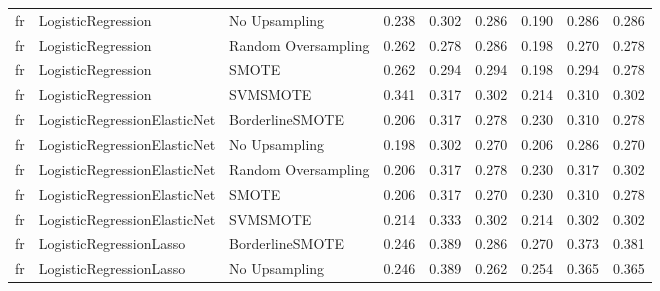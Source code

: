 \begin{tabular}{lllllllll}
      fr &              LogisticRegression &                 No Upsampling & 0.238 &                     0.302 &                 0.286 &                  0.190 &                                   0.286 &     0.286 \\
      fr &              LogisticRegression &           Random Oversampling & 0.262 &                     0.278 &                 0.286 &                  0.198 &                                   0.270 &     0.278 \\
      fr &              LogisticRegression &                         SMOTE & 0.262 &                     0.294 &                 0.294 &                  0.198 &                                   0.294 &     0.278 \\
      fr &              LogisticRegression &                      SVMSMOTE & 0.341 &                     0.317 &                 0.302 &                  0.214 &                                   0.310 &     0.302 \\
      fr &    LogisticRegressionElasticNet &               BorderlineSMOTE & 0.206 &                     0.317 &                 0.278 &                  0.230 &                                   0.310 &     0.278 \\
      fr &    LogisticRegressionElasticNet &                 No Upsampling & 0.198 &                     0.302 &                 0.270 &                  0.206 &                                   0.286 &     0.270 \\
      fr &    LogisticRegressionElasticNet &           Random Oversampling & 0.206 &                     0.317 &                 0.278 &                  0.230 &                                   0.317 &     0.302 \\
      fr &    LogisticRegressionElasticNet &                         SMOTE & 0.206 &                     0.317 &                 0.270 &                  0.230 &                                   0.310 &     0.278 \\
      fr &    LogisticRegressionElasticNet &                      SVMSMOTE & 0.214 &                     0.333 &                 0.302 &                  0.214 &                                   0.302 &     0.302 \\
      fr &         LogisticRegressionLasso &               BorderlineSMOTE & 0.246 &                     0.389 &                 0.286 &                  0.270 &                                   0.373 &     0.381 \\
      fr &         LogisticRegressionLasso &                 No Upsampling & 0.246 &                     0.389 &                 0.262 &                  0.254 &                                   0.365 &     0.365 \\

\end{tabular}

